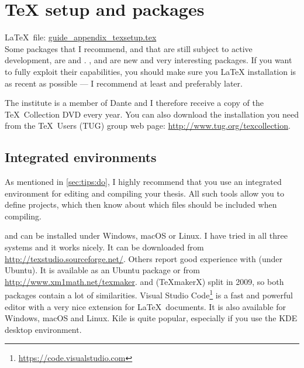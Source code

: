 
\chapter{\TeX{} setup and packages}%
\label{sec:app:tex}

\LaTeX\ file: \href{run:./guide_appendix_texsetup.tex}{guide\_appendix\_texsetup.tex}\\[1ex]
\noindent
Some packages that I recommend,
and that are still subject to active development,
are  and .
,  and 
are new and very interesting packages.
If you want to fully exploit their capabilities,
you should make sure you \LaTeX{} installation is as recent as
possible --- I recommend at least  and preferably later.

The institute is a member of Dante
and I therefore receive a copy of the \TeX\ Collection DVD every year.
You can also download the installation you need from the \TeX\
Users (TUG) group web page: \url{http://www.tug.org/texcollection}.


\section{Integrated environments}%
\label{sec:app:compile}

As mentioned in \cref{sec:tips:do}, I highly recommend
that you use an integrated environment for editing and compiling your
thesis. All such tools allow you to define projects, which then know
about which files should be included when compiling.

\TeXstudio{} and
\TeXmaker{} can be installed under Windows, macOS or
Linux. I have tried \TeXstudio in all three systems and it works nicely. It
can be downloaded from \url{http://texstudio.sourceforge.net/}.
Others report good experience with \TeXmaker (under Ubuntu).
It is available as an Ubuntu package or from
\url{http://www.xm1math.net/texmaker}.
\TeXmaker and \TeXstudio (\TeX makerX) split in 2009, so both packages
contain a lot of similarities.
Visual Studio Code\footnote{%
\url{https://code.visualstudio.com}}
is a fast and powerful editor with a very nice extension for \LaTeX\ documents.
It is also available for Windows, macOS and Linux.
Kile is quite popular, especially if you use the KDE
desktop environment. 

